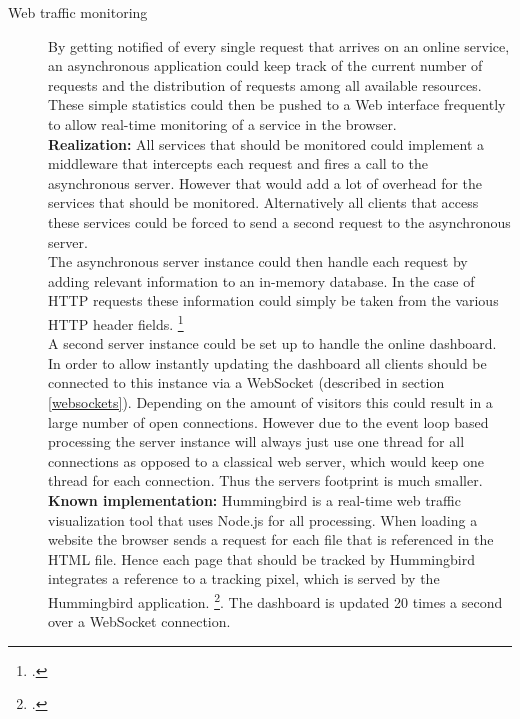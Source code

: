 \begin{description}
\item[Web traffic monitoring] By getting notified of every single request that
arrives on an online service, an asynchronous application could keep track of the
current number of requests and the distribution of requests among all
available resources. These simple statistics could then be pushed to a Web interface
frequently to allow real-time monitoring of a service in the browser.\\
\textbf{Realization:} All services that should be monitored could implement a
middleware that intercepts each request and fires a call to the asynchronous
server. However that would add a lot of overhead for the services that should
be monitored. Alternatively all clients that access these services could be forced to send a
second request to the asynchronous server.\\
The asynchronous server instance could then handle each request by adding
relevant information to an in-memory database. In the case of HTTP requests
these information could simply be taken from the various HTTP header fields.
\footcite[Cf.][]{http_rfc}\\
A second server instance could be set up to handle the online dashboard.
In order to allow instantly updating the dashboard all clients should be
connected to this instance via a WebSocket (described in section \ref{websockets}). Depending on the amount of visitors
this could result in a large number of open connections. However due to the
event loop based processing the server instance will always just use one
thread for all connections as opposed to a classical web server, which would
keep one thread for each connection. Thus the servers footprint is much
smaller.\\
\textbf{Known implementation:} Hummingbird is a real-time web traffic
visualization tool that uses Node.js for all processing. When loading a
website the browser sends a request for each file that is referenced in the
HTML file. Hence each page that should be tracked by Hummingbird integrates a
reference to a tracking pixel, which is served by the Hummingbird application.
\footcite[Cf.][]{hummingbird}. The dashboard is updated 20 times a second
over a WebSocket connection.


\end{description}
